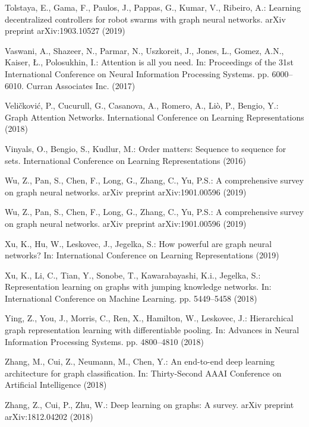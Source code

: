 \documentclass[runningheads]{llncs}
\begin{document}
\begin{thebibliography}{10}
Tolstaya, E., Gama, F., Paulos, J., Pappas, G., Kumar, V., Ribeiro, A.:
  Learning decentralized controllers for robot swarms with graph neural
  networks. arXiv preprint arXiv:1903.10527  (2019)

Vaswani, A., Shazeer, N., Parmar, N., Uszkoreit, J., Jones, L., Gomez, A.N.,
  Kaiser, {\L}., Polosukhin, I.: Attention is all you need. In: Proceedings of
  the 31st International Conference on Neural Information Processing Systems.
  pp. 6000--6010. Curran Associates Inc. (2017)

Veli{\v{c}}kovi{\'{c}}, P., Cucurull, G., Casanova, A., Romero, A., Li{\`{o}},
  P., Bengio, Y.: {Graph Attention Networks}. International Conference on
  Learning Representations  (2018)

Vinyals, O., Bengio, S., Kudlur, M.: Order matters: Sequence to sequence for
  sets. International Conference on Learning Representations  (2016)

Wu, Z., Pan, S., Chen, F., Long, G., Zhang, C., Yu, P.S.: A comprehensive
  survey on graph neural networks. arXiv preprint arXiv:1901.00596  (2019)

Wu, Z., Pan, S., Chen, F., Long, G., Zhang, C., Yu, P.S.: A comprehensive
  survey on graph neural networks. arXiv preprint arXiv:1901.00596  (2019)

Xu, K., Hu, W., Leskovec, J., Jegelka, S.: How powerful are graph neural
  networks? In: International Conference on Learning Representations (2019)

Xu, K., Li, C., Tian, Y., Sonobe, T., Kawarabayashi, K.i., Jegelka, S.:
  Representation learning on graphs with jumping knowledge networks. In:
  International Conference on Machine Learning. pp. 5449--5458 (2018)

Ying, Z., You, J., Morris, C., Ren, X., Hamilton, W., Leskovec, J.:
  Hierarchical graph representation learning with differentiable pooling. In:
  Advances in Neural Information Processing Systems. pp. 4800--4810 (2018)

Zhang, M., Cui, Z., Neumann, M., Chen, Y.: An end-to-end deep learning
  architecture for graph classification. In: Thirty-Second AAAI Conference on
  Artificial Intelligence (2018)

Zhang, Z., Cui, P., Zhu, W.: Deep learning on graphs: A survey. arXiv preprint
  arXiv:1812.04202  (2018)

\end{thebibliography}
\end{document}
